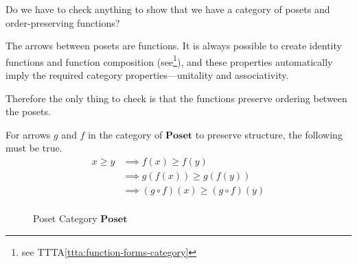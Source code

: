 \begin{ttta}
	Do we have to check anything to show that we have a category of posets and order-preserving functions?
\end{ttta}
\begin{proofitem}
	\item The arrows between posets are functions. It is always possible to create
	identity functions and function composition (see\footnote{see TTTA\ref{ttta:function-forms-category}}), and these properties
	automatically imply the required category properties---unitality and associativity.
	\item Therefore the only thing to check is that the functions preserve ordering
	between the posets.
\end{proofitem}
For arrows $g$ and $f$ in the category of $\mathbf{Poset}$ to preserve
structure, the following must be true.
\begin{align*}
	x \geq y & \implies f(x) \geq f(y)                   \\
	         & \implies g(f(x)) \geq g(f(y))             \\
	         & \implies (g\circ f)(x) \geq (g\circ f)(y) \\
\end{align*}
\begin{figure}[H]
	\begin{center}
		
	\end{center}
	\caption{Poset Category $\mathbf{Poset}$}
\end{figure}

